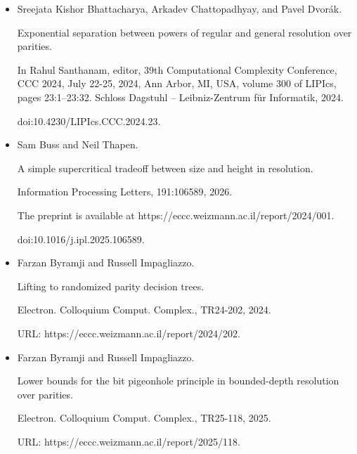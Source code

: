 \documentclass[10pt,a4paper]{article}
\begin{document}
\begin{itemize}
URL: https://eccc.weizmann.ac.il/report/2025/106.





\item 
[10]

Sreejata Kishor Bhattacharya, Arkadev Chattopadhyay, and Pavel Dvorák.


Exponential separation between powers of regular and general
resolution over parities.


In Rahul Santhanam, editor, 39th Computational Complexity
Conference, CCC 2024, July 22-25, 2024, Ann Arbor, MI, USA, volume 300
of LIPIcs, pages 23:1–23:32. Schloss Dagstuhl – Leibniz-Zentrum
für Informatik, 2024.


doi:10.4230/LIPIcs.CCC.2024.23.





\item 
[11]

Sam Buss and Neil Thapen.


A simple supercritical tradeoff between size and height in
resolution.


Information Processing Letters, 191:106589, 2026.


The preprint is available at
https://eccc.weizmann.ac.il/report/2024/001.


doi:10.1016/j.ipl.2025.106589.





\item 
[12]

Farzan Byramji and Russell Impagliazzo.


Lifting to randomized parity decision trees.


Electron. Colloquium Comput. Complex., TR24-202, 2024.


URL: https://eccc.weizmann.ac.il/report/2024/202.





\item 
[13]

Farzan Byramji and Russell Impagliazzo.


Lower bounds for the bit pigeonhole principle in bounded-depth
resolution over parities.


Electron. Colloquium Comput. Complex., TR25-118, 2025.


URL: https://eccc.weizmann.ac.il/report/2025/118.






\end{itemize}
\end{document}
